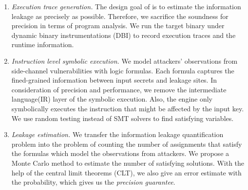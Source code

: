 \begin{enumerate}
    \item \emph{Execution trace generation.} The design goal of \tool{} is to
          estimate the information leakage as precisely as possible. Therefore,
          we sacrifice the soundness for precision in terms of program
          analysis. We run the target binary under dynamic binary instrumentations (DBI) to
          record execution traces and the runtime information.
    \item \emph{Instruction level symbolic execution.} We model attackers'
          observations from side-channel vulnerabilities with logic formulas.
          Each formula captures the fined-grained information between input
          secrets and leakage sites. In consideration of precision and
          performance, we remove the intermediate language(IR) layer of the
          symbolic execution. Also, the engine only symbolically executes the
          instruction that might be affected by the input key. We use random
          testing instead of SMT solvers to find satisfying variables. 
    \item \emph{Leakage estimation.} We transfer the information leakage quantification
          problem into the problem of counting the number of assignments that satisfy the
          formulas which model the observations from attackers. We propose a
          Monte Carlo method to estimate the number of satisfying solutions.
          With the help of the central
          limit theorems (CLT), we also give an error estimate with the probability,
          which gives us the \emph{precision guarantee}.

\end{enumerate}



